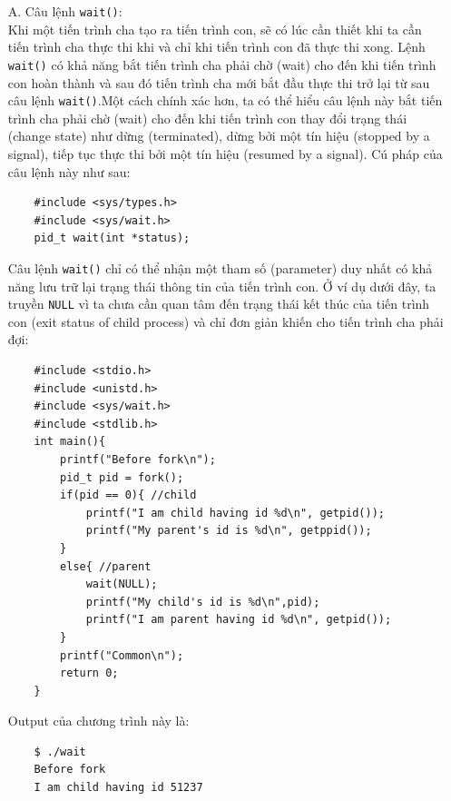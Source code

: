 \documentclass{article}
\begin{document}
\begin{enumerate}
    \item[A.] Câu lệnh \verb|wait()|:
\\ Khi một tiến trình cha tạo ra tiến trình con, sẽ có lúc cần thiết khi ta cần tiến trình cha thực thi khi và chỉ khi tiến trình con đã thực thi xong. Lệnh
\verb|wait()| có khả năng bắt tiến trình cha phải chờ (wait) cho đến khi tiến trình con hoàn thành và sau đó tiến trình cha mới bắt đầu thực thi trở lại từ sau câu lệnh \verb|wait()|.Một
cách chính xác hơn, ta có thể hiểu câu lệnh này bắt tiến trình cha phải chờ (wait) cho đến khi tiến trình con thay đổi trạng thái (change state) như dừng (terminated), dừng bởi một tín hiệu (stopped by a signal), tiếp
tục thực thi bởi một tín hiệu (resumed by a signal). Cú pháp của câu lệnh này như sau:
\begin{verbatim}
    #include <sys/types.h>
    #include <sys/wait.h>
    pid_t wait(int *status);
\end{verbatim}
Câu lệnh \verb|wait()| chỉ có thể nhận một tham số (parameter) duy nhất có khả năng lưu trữ lại trạng thái thông tin của tiến trình con. Ở ví
dụ dưới đây, ta truyền \verb|NULL| vì ta chưa cần quan tâm đến trạng thái kết thúc của tiến trình con (exit status of child process) và chỉ đơn giản
khiến cho tiến trình cha phải đợi:
\begin{verbatim}
    #include <stdio.h>
    #include <unistd.h>
    #include <sys/wait.h>
    #include <stdlib.h>
    int main(){
        printf("Before fork\n");
        pid_t pid = fork(); 
        if(pid == 0){ //child
            printf("I am child having id %d\n", getpid());
            printf("My parent's id is %d\n", getppid());
        }
        else{ //parent
            wait(NULL);
            printf("My child's id is %d\n",pid);
            printf("I am parent having id %d\n", getpid());
        }
        printf("Common\n");
        return 0;
    }    
\end{verbatim}
Output của chương trình này là:
\begin{verbatim}
    $ ./wait                                                                                                                                                                                                       
    Before fork                                                                                                                                                                                                    
    I am child having id 51237                                                                                                                                                                                     

\end{verbatim}
\end{enumerate}
\end{document}
